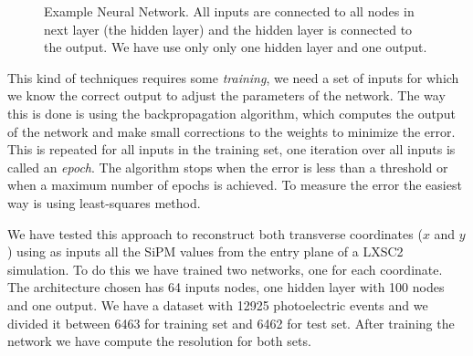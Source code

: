 \begin{figure}[!htb]
	\centering
	\caption{\label{fig.nn} Example Neural Network. All inputs are connected to all nodes in next layer (the hidden layer) and the hidden layer is connected to the output. We have use only only one hidden layer and one output.}
\end{figure}

This kind of techniques requires some {\it training}, we need a set of inputs for which we know the correct output to adjust the parameters of the network. The way this is done is using the backpropagation algorithm, which computes the output of the network
and make small corrections to the weights to minimize the error. This is repeated for all inputs in the training set, one iteration over all inputs is called an {\it epoch}. The algorithm stops when the error is less than a threshold  or when a maximum number of epochs is achieved. To measure the error the easiest way is using least-squares method.

We have tested this approach to reconstruct both transverse coordinates ($x$ and $y$) using as inputs all the SiPM values from the entry plane of a LXSC2 simulation. To do this we have trained two networks, one for each coordinate. The architecture chosen has 64 inputs nodes, one hidden layer with 100 nodes and one output. We have a dataset with 12925 photoelectric events and we divided it between 6463 for training set and 6462 for test set. After training the network we have compute the resolution for both sets. 

